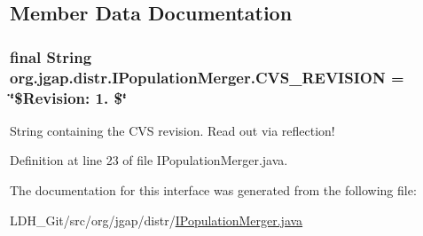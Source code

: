 \subsection{Member Data Documentation}
\hypertarget{interfaceorg_1_1jgap_1_1distr_1_1_i_population_merger_ac43347a4519095404ac847075c6b1702}{
\subsubsection[{C\-V\-S\-\_\-\-R\-E\-V\-I\-S\-I\-O\-N}]{\setlength{\rightskip}{0pt plus 5cm}final String org.\-jgap.\-distr.\-I\-Population\-Merger.\-C\-V\-S\-\_\-\-R\-E\-V\-I\-S\-I\-O\-N = \char`\"{}\$Revision\-: 1. \$\char`\"{}\hspace{0.3cm}{\ttfamily [static]}}}\label{interfaceorg_1_1jgap_1_1distr_1_1_i_population_merger_ac43347a4519095404ac847075c6b1702}
String containing the C\-V\-S revision. Read out via reflection! 

Definition at line 23 of file I\-Population\-Merger.\-java.



The documentation for this interface was generated from the following file\-:\begin{DoxyCompactItemize}
\item 
L\-D\-H\-\_\-\-Git/src/org/jgap/distr/\hyperlink{_i_population_merger_8java}{I\-Population\-Merger.\-java}\end{DoxyCompactItemize}
